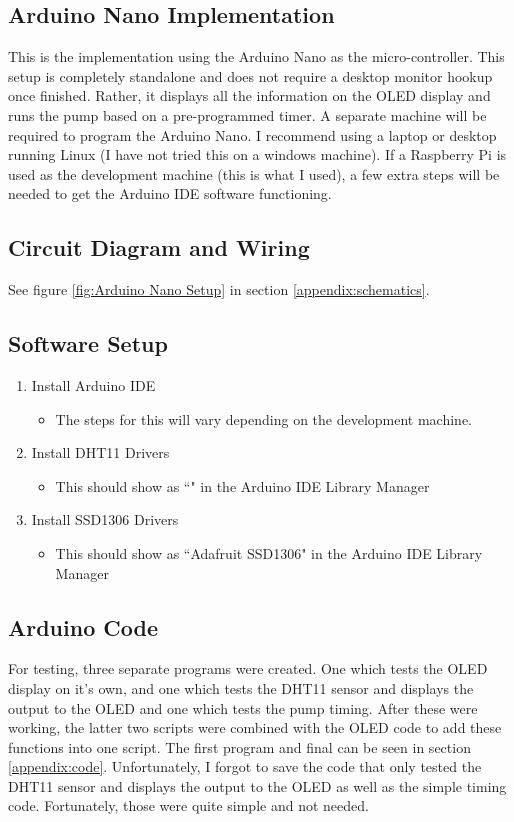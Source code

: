\documentclass{article}
\begin{document}
\begin{multicols}{2}
		\section{Arduino Nano Implementation}
		This is the implementation using the Arduino Nano as the micro-controller. This setup is completely standalone and does not require a desktop monitor hookup once finished. Rather, it displays all the information on the OLED display and runs the pump based on a pre-programmed timer. A separate machine will be required to program the Arduino Nano. I recommend using a laptop or desktop running Linux (I have not tried this on a windows machine). If a Raspberry Pi is used as the development machine (this is what I used), a few extra steps will be needed to get the Arduino IDE software functioning. 
		
		\subsection{Circuit Diagram and Wiring}
		See figure \ref{fig:Arduino Nano Setup} in section \ref{appendix:schematics}.
		
		\subsection{Software Setup}
		\begin{enumerate}
			\item Install Arduino IDE
			\begin{itemize}
				\item The steps for this will vary depending on the development machine.
			\end{itemize}
			\item Install DHT11 Drivers
			\begin{itemize}
				\item This should show as ``" in the Arduino IDE Library Manager
			\end{itemize}
			\item Install SSD1306 Drivers
			\begin{itemize}
				\item This should show as ``Adafruit SSD1306" in the Arduino IDE Library Manager
			\end{itemize}
		\end{enumerate}
		
		\subsection{Arduino Code}
		For testing, three separate programs were created. One which tests the OLED display on it's own, and one which tests the DHT11 sensor and displays the output to the OLED and one which tests the pump timing. After these were working, the latter two scripts were combined with the OLED code to add these functions into one script. The first program and final can be seen in section \ref{appendix:code}. Unfortunately, I forgot to save the code that only tested the DHT11 sensor and displays the output to the OLED as well as the simple timing code. Fortunately, those were quite simple and not needed.
		

\end{multicols}
\end{document}
